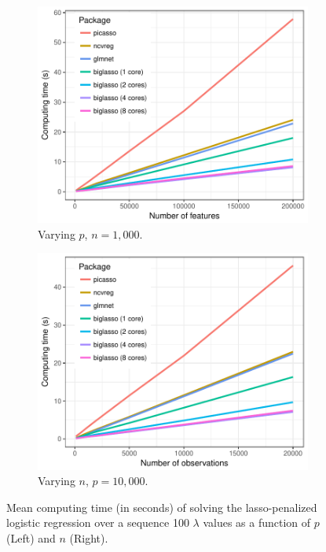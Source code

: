 \begin{figure}[htbp]
\centering
\begin{subfigure}{.5\textwidth}
  \centering
  \includegraphics[width=\linewidth]{Figures/2018-02-27_vary_p_pkgs_logistic.pdf}
  \caption{Varying $p$, $n = 1,000$.}
\end{subfigure}%
\begin{subfigure}{.5\textwidth}
  \centering
  \includegraphics[width=\linewidth]{Figures/2018-02-27_vary_n_pkgs_logistic.pdf}
  \caption{Varying $n$, $p = 10,000$.}
\end{subfigure}
\caption{Mean computing time (in seconds) of solving the lasso-penalized logistic regression over a sequence 100 $\lambda$ values as a function of $p$ (Left) and $n$ (Right).}
\label{fig_simu_res_log}
\end{figure}


